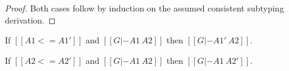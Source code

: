 \begin{proof}
  Both cases follow by induction on the assumed consistent subtyping
  derivation.
\end{proof}

\begin{lemma}
  \label{lemma:congruence_of_type_consistency_along_type_precision}
  \begin{enumR}
  \item[] 
  \item If $[[A1 <= A1']]$ and $[[G |- A1 ~ A2]]$ then
    $[[G |- A1' ~ A2]]$.
    
  \item If $[[A2 <= A2']]$ and $[[G |- A1 ~ A2]]$ then
    $[[G |- A1 ~ A2']]$.  
  \end{enumR}
\end{lemma}

